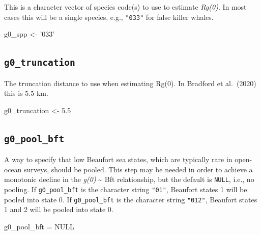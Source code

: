 \documentclass[
]{book}
\newenvironment{Shaded}{\begin{snugshade}}{\end{snugshade}}
\newcommand{\FloatTok}[1]{\textcolor[rgb]{0.00,0.00,0.81}{#1}}
\newcommand{\NormalTok}[1]{#1}
\newcommand{\OtherTok}[1]{\textcolor[rgb]{0.56,0.35,0.01}{#1}}
\newcommand{\StringTok}[1]{\textcolor[rgb]{0.31,0.60,0.02}{#1}}
\begin{document}
This is a character vector of species code(s) to use to estimate \emph{Rg(0)}. In most cases this will be a single species, e.g., \texttt{"033"} for false killer whales.

\begin{Shaded}
\begin{Highlighting}[]
\NormalTok{g0_spp <-}\StringTok{ '033'}
\end{Highlighting}
\end{Shaded}

\hypertarget{g0_truncation}{%
\subsection*{\texorpdfstring{\texttt{g0\_truncation}}{g0\_truncation}}\label{g0_truncation}}

The truncation distance to use when estimating Rg(0). In Bradford et al.~(2020) this is 5.5 km.

\begin{Shaded}
\begin{Highlighting}[]
\NormalTok{g0_truncation <-}\StringTok{ }\FloatTok{5.5}
\end{Highlighting}
\end{Shaded}

\hypertarget{g0_pool_bft}{%
\subsection*{\texorpdfstring{\texttt{g0\_pool\_bft}}{g0\_pool\_bft}}\label{g0_pool_bft}}

A way to specify that low Beaufort sea states, which are typically rare in open-ocean surveys, should be pooled. This step may be needed in order to achieve a monotonic decline in the \emph{g(0)} \textasciitilde{} Bft relationship, but the default is \texttt{NULL}, i.e., no pooling. If \texttt{g0\_pool\_bft} is the character string \texttt{"01"}, Beaufort states 1 will be pooled into state 0. If \texttt{g0\_pool\_bft} is the character string \texttt{"012"}, Beaufort states 1 and 2 will be pooled into state 0.

\begin{Shaded}
\begin{Highlighting}[]
\NormalTok{g0_pool_bft =}\StringTok{ }\OtherTok{NULL}
\end{Highlighting}
\end{Shaded}
\end{document}
